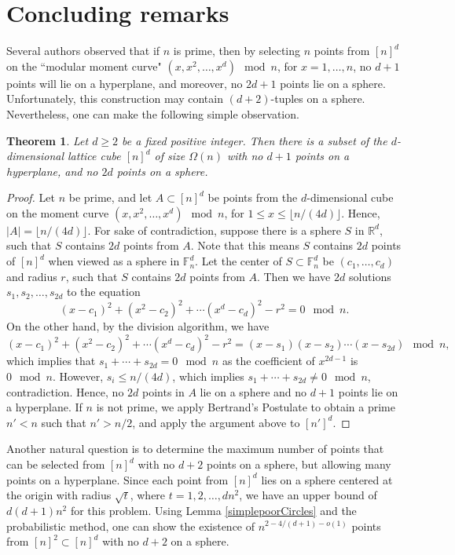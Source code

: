 \documentclass[11pt]{article}
\theoremstyle{plain}
\newtheorem{theorem}{Theorem}[section]
\theoremstyle{definition}
\theoremstyle{remark}
\begin{document}
\section{Concluding remarks}
%
%
Several authors \cite{roth,Le,BK} observed that if $n$ is prime, then by selecting $n$ points from $[n]^d$ on the ``modular moment curve" $(x,x^2,\ldots, x^d) \mod n$, for $x = 1,\ldots, n$, no $d+1$ points will lie on a hyperplane, and moreover, no $2d+1$ points lie on a sphere.  Unfortunately, this construction may contain $(d+2)$-tuples on a sphere.  Nevertheless, one can make the following simple observation.
%
%
%
%
\begin{theorem}\label{mcurve} Let $d \geq 2$ be a fixed positive integer. Then there is a subset of the $d$-dimensional lattice cube $[n]^d$ of size $\Omega(n)$ with no $d + 1$ points on a hyperplane, and no $2d$ points on a sphere.
\end{theorem}
%
%
%
%
\begin{proof} 
%
Let $n$ be prime, and let $A\subset [n]^d$ be points from the $d$-dimensional cube on the moment curve $(x,x^2,\ldots, x^d) \mod n$, for $1 \leq x \leq \lfloor n/(4d)\rfloor$. Hence, $|A| = \lfloor n/(4d)\rfloor$.  For sake of contradiction, suppose there is a sphere $S$ in $\mathbb{R}^d$, such that $S$ contains $2d$ points from $A$. Note that this means $S$ contains $2d$ points of $[n]^d$ when viewed as a sphere in $\mathbb{F}_n^d$. Let the center of $S \subset \mathbb{F}_n^d$ be $(c_1,\ldots, c_d)$ and radius $r$, such that $S$ contains $2d$ points from $A$. Then we have $2d$ solutions $s_1,s_2,\ldots, s_{2d}$ to the equation
%
$$(x-c_1)^2 + (x^2 - c_2)^2 + \cdots (x^d - c_d)^2 - r^2 = 0 \mod n.$$
%
%
    \noindent On the other hand, by the division algorithm, we have
%
%
    $$(x-c_1)^2 + (x^2 - c_2)^2 + \cdots (x^d - c_d)^2 - r^2  = (x - s_1)(x-s_2)\cdots (x-s_{2d})  \mod n,$$
%
    \noindent which implies that $s_1 + \cdots +s_{2d} = 0 \mod n$ as the coefficient of $x^{2d-1}$ is $0\mod n$.  However, $s_i \leq  n/(4d)$, which implies $s_1 + \cdots +s_{2d} \neq 0 \mod n$, contradiction.  Hence, no $2d$ points in $A$ lie on a sphere and no $d+1$ points lie on a hyperplane.  If $n$ is not prime, we apply Bertrand's Postulate to obtain a prime $n' < n$ such that $n' > n/2$, and apply the argument above to $[n']^d$.\end{proof}
%
%
%
%
%
%
Another natural question is to determine the maximum number of points that can be selected from $[n]^d$ with no $d+2$ points on a sphere, but allowing many points on a hyperplane.  Since each point from $[n]^d$ lies on a sphere centered at the origin with radius $\sqrt{t}$, where $t  = 1,2,\ldots, dn^2$, we have an upper bound of $d(d+1)n^2$ for this problem. Using Lemma \ref{simplepoorCircles} and the probabilistic method, one can show the existence of $n^{2 - 4/(d+1) - o(1)}$ points from $[n]^2 \subset [n]^d$ with no $d+2$ on a sphere.   
%
%
%
\end{document}
